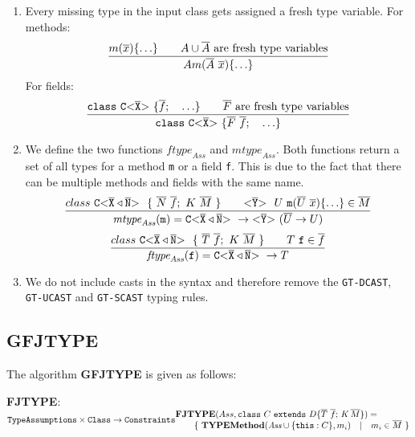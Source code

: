 \documentclass[acmsmall,screen,review]{acmart}
\begin{document}
\begin{enumerate}
\item Every missing type in the input class gets assigned a fresh type variable.
For methods:
\begin{align*}
  \frac{\displaystyle 
  m(\overline{x}) \{ \ldots \} \quad \quad A \cup \overline{A} \ \text{are fresh type variables}
  }{\displaystyle 
  A m(\overline{A}\ \overline{x}) \{ \ldots \}
  }
  \end{align*}
  For fields:
\begin{align*}
  \frac{\displaystyle 
  \texttt{class}\ \mathtt{C {\tt <} \overline{X} {\tt >} \ } \{ \overline{f}; \quad \ldots \} \quad \quad \overline{F} \ \text{are fresh type variables}
  }{\displaystyle 
    \texttt{class}\ \mathtt{C {\tt <} \overline{X} {\tt >} \ } \{ \overline{F} \ \overline{f}; \quad \ldots \}
  }
\end{align*}
\item We define the two functions $\textit{ftype}_\textit{Ass}$ and $\textit{mtype}_\textit{Ass}$.
Both functions return a set of all types for a method \texttt{m} or a field \texttt{f}.
This is due to the fact that there can be multiple methods and fields with the same name.
\begin{align*}
  \frac{\displaystyle 
    class\ \mathtt{C {\tt <} \overline{X} \triangleleft \overline{N} {\tt >} \ }\ \{\ \overline{N}\ \overline{f};\ K\ \overline{M}\ \} \quad \quad
    \mathtt{ {\tt <} \overline{Y} {\tt >} \ }\ U\ \texttt{m}(\overline{U}\ \overline{x}) \{ \ldots \} \in \overline{M}
  }{\displaystyle 
    \textit{mtype}_\textit{Ass}(\texttt{m}) = \mathtt{C {\tt <} \overline{X} \triangleleft \overline{N} {\tt >} \ } \to \mathtt{ {\tt <} \overline{Y} {\tt >} \ } (\overline{U} \to U )
  }
\end{align*}
\begin{align*}
  \frac{\displaystyle 
    class\ \mathtt{C {\tt <} \overline{X} \triangleleft \overline{N} {\tt >} \ }\ \{\ \overline{T}\ \overline{f};\ K\ \overline{M}\ \} \quad \quad
    T\ \texttt{f} \in \overline{f}
  }{\displaystyle 
    \textit{ftype}_\textit{Ass}(\texttt{f}) = \mathtt{C {\tt <} \overline{X} \triangleleft \overline{N} {\tt >} \ } \to T
  }
\end{align*}
\item We do not include casts in the syntax and therefore remove the \texttt{GT-DCAST}, \texttt{GT-UCAST} and \texttt{GT-SCAST} typing rules.
\end{enumerate}


\subsection{GFJTYPE}

The algorithm \textbf{GFJTYPE} is given as follows:

\textbf{FJTYPE}:
$\texttt{TypeAssumptions} \times
\texttt{Class} \rightarrow \texttt{Constraints}\\
 \begin{array}{@{}l@{}l@{}l}
 \textbf{FJT}&\textbf{Y} & \textbf{PE}(Ass, \mathtt{class } \ C \ \mathtt{ extends } \ D \{ \overline{T} \ \overline{f}; \, K \, \overline{M} \}) =\\
& \multicolumn{2}{@{}l@{}}{ \{ \ \textbf{TYPEMethod}(\textit{Ass} \cup \{ \mathtt{this} : C \}, m_i) \quad | \quad m_i \in \overline{M} \ \} }\\ 
\end{array}$
\end{document}
